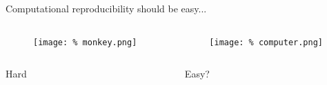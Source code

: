 
\begin{frame}{Computational reproducibility should be easy...}

  \begin{columns}
    \begin{column}{.5\textwidth}
      \begin{figure}
        \centering
        \texttt{[image: \%
          monkey.png]}  %
      \end{figure}
      
    \end{column}
    \begin{column}{.5\textwidth}

      \begin{figure}
        \centering
        \texttt{[image: \%
          computer.png]}  %
      \end{figure}
      
    \end{column}
  \end{columns}

  \begin{columns}
    \begin{column}{.5\textwidth}
      \begin{center}
        Hard
      \end{center}
      
    \end{column}
    \begin{column}{.5\textwidth}
      \begin{center}
        Easy?
      \end{center}
      
    \end{column}
  \end{columns}
  
\end{frame}


